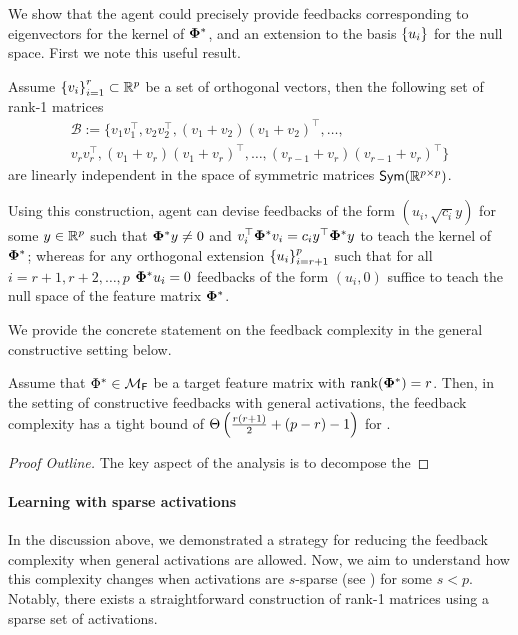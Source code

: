 We show that the agent could precisely provide feedbacks corresponding to eigenvectors for the kernel of $\boldsymbol{\Phi}^*$, and an extension to the basis $\left\{u_i\right\}$ for the null space. First we note this useful result.
\begin{lemma}
    Assume $\left\{v_i\right\}_{i=1}^r \subset \mathbb{R}^p$ be a set of orthogonal vectors, then the following set of rank-1 matrices
    \begin{gather*}
        \mathcal{B} := \{v_1v_1^{\top},v_2v_2^{\top}, (v_1 + v_2)(v_1 + v_2)^{\top},\ldots,\\v_rv_r^{\top}, (v_1 + v_r)(v_1 + v_r)^{\top},\ldots, (v_{r-1} + v_r)(v_{r-1} + v_r)^{\top}\}
    \end{gather*}
    are linearly independent in the space of symmetric matrices $\textsf{Sym}(\mathbb{R}^{p\times p})$.
\end{lemma}
Using this construction, agent can devise feedbacks of the form $(u_i, \sqrt{c_i} y)$ for some $y \in \mathbb{R}^p$ such that $\boldsymbol{\Phi}^*y \neq 0$ and $v_i^\top \boldsymbol{\Phi}^*v_i = c_iy^\top \boldsymbol{\Phi}^*y$ to teach the kernel of $\boldsymbol{\Phi}^*$; whereas for any orthogonal extension $\left\{u_i\right\}_{i = r+1}^p$ such that for all $i = r+1, r+2,\ldots,p$ $\boldsymbol{\Phi}^*u_i = 0$ feedbacks of the form $(u_i,0)$ suffice to teach the null space of the feature matrix $\boldsymbol{\Phi}^*$.

We provide the  concrete statement on the feedback complexity in the general constructive setting below.

\begin{theorem}\label{thm: constructgeneral}
    Assume that $\Phi^* \in {\mathcal{M}}_{\textsf{F}}$ be a target feature matrix with $\text{rank}({\boldsymbol{\Phi}^*}) = r$. %
    Then, in the setting of constructive feedbacks with general activations, the feedback complexity has a tight bound of $\Theta \left( {\frac{r(r+1)}{2} + (p - r) - 1} \right) $ for .
\end{theorem}
\begin{proof}[Proof Outline] The key aspect of the analysis is to decompose the 
    
\end{proof}
\fi
\paragraph{Learning with sparse activations} In the discussion above, we demonstrated a strategy for reducing the feedback complexity when general activations are allowed. Now, we aim to understand how this complexity changes when activations are $s$-sparse (see ) for some $s < p$. Notably, there exists a straightforward construction of rank-1 matrices using a sparse set of activations.

